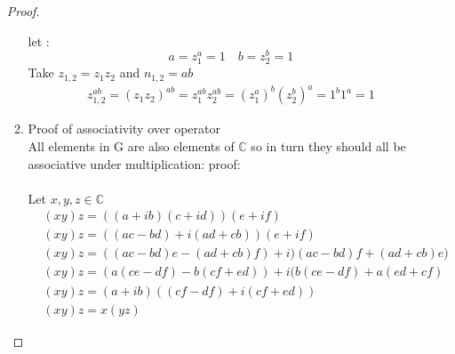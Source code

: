 \documentclass[11pt]{article}
\theoremstyle{definition}  %
\begin{document}
\begin{enumerate}
\begin{proof}
\begin{enumerate}
     let :
     \[
       a=z_1^a=1\quad b=z_2^b=1
     \]
     Take $z_{1,2}=z_1z_2$ and $n_{1,2}=ab$
     \begin{align*}
       z_{1,2}^{ab}=(z_1z_2)^{ab}=z_1^{ab}z_2^{ab}=(z_1^a)^b(z_2^b)^a=1^b1^a=1
     \end{align*}
    \item Proof of associativity over operator\\
    All elements in G are also elements of $\mathbb{C}$ so in turn they should all be associative under multiplication: proof:\\\\
    Let $x,y,z\in \mathbb{C}$
    \begin{align*}
      &(xy)z=((a+ib)(c+id))(e+if)\\
      &(xy)z=((ac - bd) +i(ad + cb))(e + if)\\
      &(xy)z=((ac - bd)e - (ad + cb)f) + i)(ac - bd)f + (ad + cb)e)\\
      &(xy)z=(a(ce - df) - b(cf + ed)) + i(b(ce - df) + a(ed + cf)\\
      &(xy)z= (a + ib)((cf - df) + i(cf + ed))\\
      &(xy)z=x(yz)
    \end{align*}



\end{enumerate}
\end{proof}
\end{enumerate}
\end{document}
